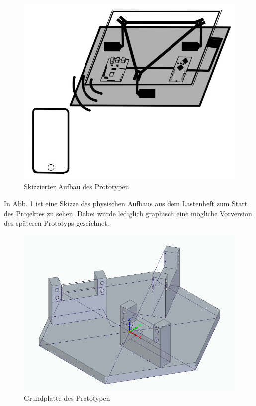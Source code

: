 \documentclass[12pt,a4paper,bibliography=totoc,listof=totoc]{scrartcl}
\begin{document}
\begin{figure}[htbp]
	\centering
	\includegraphics[scale = 0.9]{pics/SkizzeAufbau}
	\caption{Skizzierter Aufbau des Prototypen}
	\label{fig:Skizze}
\end{figure}

In Abb. \ref{fig:Skizze} ist eine Skizze des physischen Aufbaus aus dem Lastenheft zum Start des Projektes zu 
sehen. Dabei wurde lediglich graphisch eine mögliche Vorversion des späteren Prototyps gezeichnet. 

\begin{figure}[htbp]
	\centering
	\includegraphics[scale = 0.45]{pics/BildGrundplatte}
	\caption{Grundplatte des Prototypen}
	\label{fig:Grundplatte}
\end{figure}
\end{document}
